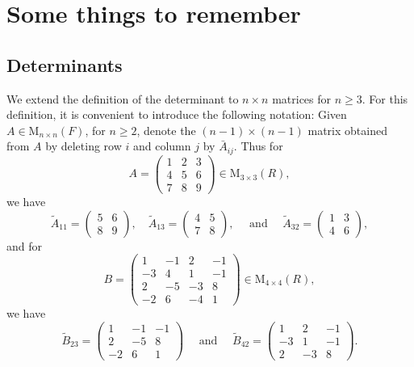 \documentclass{report}
\newcommand{\coverPage}[6]{%
\begin{titlepage}

    \newcommand{\HRule}{\rule{\linewidth}{0.5mm}}
    \newcommand{\department}{#1}
    \newcommand{\course}{#2}
    \newcommand{\titleValue}{#3}
    \newcommand{\subtitleValue}{#4}
    \newcommand{\authorName}{#5}

    \center

    \vspace{0.5cm}
    \textsc{\Large \department}\\[0.5cm]
    \textsc{\Large \course}\\[0.5cm]
    \vfill


    \HRule\\
    \Huge
    \textbf{\titleValue}\\[0.5cm]
    \Large
    \textbf{\subtitleValue}\\
    \HRule\\[0.5cm]


    \vfill
    \Large
    \textit{\authorName}\\
    {\large \today}\\[2cm]

\end{titlepage}
}
\begin{document}
    \tableofcontents
    \chapter{Some things to remember}
    \section{Determinants}
    We extend the definition of the determinant to $n \times n$ matrices for $n \geq 3$. For this definition, it is convenient to introduce the following notation: Given $A \in \mathrm{M}_{n \times n}(F)$, for $n \geq 2$, denote the $(n-1) \times(n-1)$ matrix obtained from $A$ by deleting row $i$ and column $j$ by $\bar{A}_{i j}$. Thus for
    $$
    A=\left(\begin{array}{lll}
    1 & 2 & 3 \\
    4 & 5 & 6 \\
    7 & 8 & 9
    \end{array}\right) \in \mathrm{M}_{3 \times 3}(R),
    $$
    we have
    $$
    \tilde{A}_{11}=\left(\begin{array}{ll}
    5 & 6 \\
    8 & 9
    \end{array}\right), \quad \tilde{A}_{13}=\left(\begin{array}{ll}
    4 & 5 \\
    7 & 8
    \end{array}\right), \quad \text { and } \quad \tilde{A}_{32}=\left(\begin{array}{ll}
    1 & 3 \\
    4 & 6
    \end{array}\right),
    $$
    and for
    $$
    B=\left(\begin{array}{rrrr}
    1 & -1 & 2 & -1 \\
    -3 & 4 & 1 & -1 \\
    2 & -5 & -3 & 8 \\
    -2 & 6 & -4 & 1
    \end{array}\right) \in \mathrm{M}_{4 \times 4}(R),
    $$
    we have
    $$
    \tilde{B}_{23}=\left(\begin{array}{rrr}
    1 & -1 & -1 \\
    2 & -5 & 8 \\
    -2 & 6 & 1
    \end{array}\right) \quad \text { and } \quad \tilde{B}_{42}=\left(\begin{array}{rrr}
    1 & 2 & -1 \\
    -3 & 1 & -1 \\
    2 & -3 & 8
    \end{array}\right) .
    $$
\end{document}
